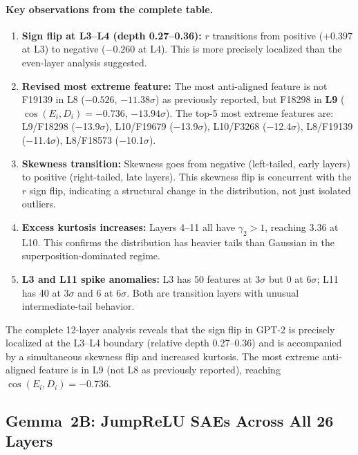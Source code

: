 \documentclass[11pt,a4paper]{article}
\newcommand{\cosED}{\cos(E_i, D_i)}
\begin{document}
\paragraph{Key observations from the complete table.}
\begin{enumerate}
  \item \textbf{Sign flip at L3--L4 (depth 0.27--0.36):} $r$ transitions from positive ($+0.397$ at L3) to negative ($-0.260$ at L4). This is more precisely localized than the even-layer analysis suggested.
  \item \textbf{Revised most extreme feature:} The most anti-aligned feature is not F19139 in L8 ($-0.526$, $-11.38\sigma$) as previously reported, but F18298 in \textbf{L9} ($\cosED = -0.736$, $-13.94\sigma$). The top-5 most extreme features are: L9/F18298 ($-$13.9$\sigma$), L10/F19679 ($-$13.9$\sigma$), L10/F3268 ($-$12.4$\sigma$), L8/F19139 ($-$11.4$\sigma$), L8/F18573 ($-$10.1$\sigma$).
  \item \textbf{Skewness transition:} Skewness goes from negative (left-tailed, early layers) to positive (right-tailed, late layers). This skewness flip is concurrent with the $r$ sign flip, indicating a structural change in the distribution, not just isolated outliers.
  \item \textbf{Excess kurtosis increases:} Layers 4--11 all have $\gamma_2 > 1$, reaching $3.36$ at L10. This confirms the distribution has heavier tails than Gaussian in the superposition-dominated regime.
  \item \textbf{L3 and L11 spike anomalies:} L3 has 50 features at $3\sigma$ but 0 at $6\sigma$; L11 has 40 at $3\sigma$ and 6 at $6\sigma$. Both are transition layers with unusual intermediate-tail behavior.
\end{enumerate}

\begin{keyinsight}
The complete 12-layer analysis reveals that the sign flip in GPT-2 is precisely localized at the L3--L4 boundary (relative depth 0.27--0.36) and is accompanied by a simultaneous skewness flip and increased kurtosis. The most extreme anti-aligned feature is in L9 (not L8 as previously reported), reaching $\cosED = -0.736$.
\end{keyinsight}

\subsection{Gemma~2B: JumpReLU SAEs Across All 26 Layers}
\label{sec:gemma}
\end{document}

